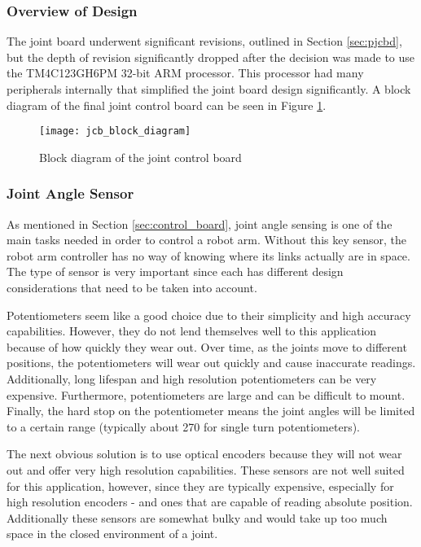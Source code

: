 \subsubsection{Overview of Design}
The joint board underwent significant revisions, outlined in Section \ref{sec:pjcbd}, but the depth of revision significantly dropped after the decision was made to use the TM4C123GH6PM 32-bit ARM processor. This processor had many peripherals internally that simplified the joint board design significantly. A block diagram of the final joint control board can be seen in Figure \ref{fig:jcb_block_diagram}.

\begin{figure}[H]
	\centering
	\texttt{[image: jcb\_block\_diagram]}
	\caption{Block diagram of the joint control board}
	\label{fig:jcb_block_diagram}
\end{figure}

\subsubsection{Joint Angle Sensor}
\label{sec:jas}
As mentioned in Section \ref{sec:control_board}, joint angle sensing is one of the main tasks needed in order to control a robot arm. Without this key sensor, the robot arm controller has no way of knowing where its links actually are in space. The type of sensor is very important since each has different design considerations that need to be taken into account.

\noindent Potentiometers seem like a good choice due to their simplicity and high accuracy capabilities. However, they do not lend themselves well to this application because of how quickly they wear out. Over time, as the joints move to different positions, the potentiometers will wear out quickly and cause inaccurate readings. Additionally, long lifespan and high resolution potentiometers can be very expensive. Furthermore, potentiometers are large and can be difficult to mount. Finally, the hard stop on the potentiometer means the joint angles will be limited to a certain range (typically about 270 \textdegree for single turn potentiometers).

\noindent The next obvious solution is to use optical encoders because they will not wear out and offer very high resolution capabilities. These sensors are not well suited for this application, however, since they are typically expensive, especially for high resolution encoders - and ones that are capable of reading absolute position. Additionally these sensors are somewhat bulky and would take up too much space in the closed environment of a joint. 


